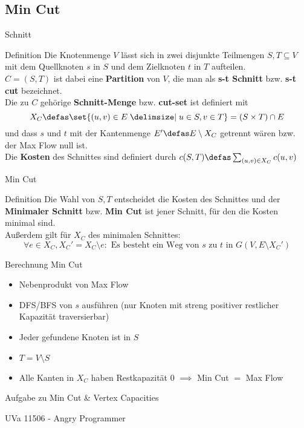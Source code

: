 \subsection{Min Cut}
\begin{frame}{Schnitt}
    \begin{block}{Definition}
        \pause Die Knotenmenge $V$ lässt sich in zwei disjunkte Teilmengen \(S, T
        \subseteq V\) mit dem Quellknoten $s$ in $S$ und dem Zielknoten $t$ in $T$
        aufteilen.\\\pause
        \(C = (S, T)\) ist dabei eine \textbf{Partition} von
        $V$, die man als \textbf{s-t Schnitt} bzw. \textbf{s-t cut} bezeichnet.\\\pause
        Die zu $C$ gehörige \textbf{Schnitt-Menge} bzw. \textbf{cut-set} ist
        definiert mit
        \[X_C \defas \set{(u, v) \in E \given u \in S, v \in T} = (S\times
        T)\cap E\]
        und dass $s$ und $t$ mit der Kantenmenge
        \(E' \defas E\setminus X_C\) getrennt wären \pause bzw. der Max Flow null ist.\\\pause
        Die \textbf{Kosten} des Schnittes sind definiert durch
        \(c(S, T) \defas \sum\nolimits_{(u, v) \in X_C} c(u, v)\)
    \end{block}
\end{frame}

\begin{frame}{Min Cut}
    \begin{block}{Definition}
        \pause Die Wahl von $S, T$ entscheidet die Kosten des Schnittes und der
        \textbf{Minimaler Schnitt} bzw. \textbf{Min Cut} ist jener Schnitt, für
        den die Kosten minimal sind.\\\pause
        Außerdem gilt für $X_C$ des minimalen Schnittes:
        \[\forall e \in X_C, X_C' = X_C \setminus e :
        \text{ Es besteht ein Weg von $s$ zu $t$ in } G(V, E \setminus X_C')\]
    \end{block}
\end{frame}

\begin{frame}{Berechnung Min Cut}
    \begin{itemize}
        \item Nebenprodukt von Max Flow
        \pause\item DFS/BFS von $s$ ausführen (nur Knoten mit streng positiver restlicher Kapazität
        traversierbar)
        \pause\item Jeder gefundene Knoten ist in $S$
        \pause\item \(T = V\setminus S\)
        \pause\item Alle Kanten in $X_C$ haben Restkapazität $0$ \(\implies\) Min
        Cut $=$ Max Flow
    \end{itemize}
\end{frame}

\begin{frame}{Aufgabe zu Min Cut \& Vertex Capacities}
    \begin{block}{UVa 11506 - Angry Programmer}

    \end{block}

\end{frame}
